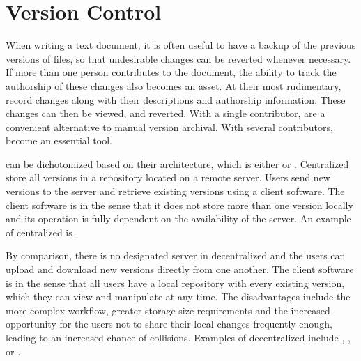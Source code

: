 
\section{Version Control}\label{sec:vcs}
When writing a text document, it is often useful to have a backup of the
previous versions of files, so that undesirable changes can be reverted whenever
necessary. If more than one person contributes to the document, the ability to
track the authorship of these changes also becomes an asset. At their most
rudimentary,  record changes along with their descriptions and
authorship information. These changes can then be viewed, and reverted.
With a single contributor,  are a convenient alternative to manual
version archival. With several contributors,  become an essential
tool.

 can be dichotomized based on their architecture, which is either
 or 
. Centralized  store all versions
in a repository located on a remote server. Users send new versions to the
server and retrieve existing versions using a client software. The client
software is  in the sense that it does not store more than one
version locally and its operation is fully dependent on the availability of the
server. An example of centralized  is .

By comparison, there is no designated server in decentralized  and
the users can upload and download new versions directly from one another. The
client software is  in the sense that all users have a local
repository with every existing version, which they can view and manipulate
at any time. The disadvantages include the more complex workflow, greater
storage size requirements and the increased opportunity for the users not to
share their local changes frequently enough, leading to an increased chance of
collisions. Examples of decentralized  include ,
, or .


